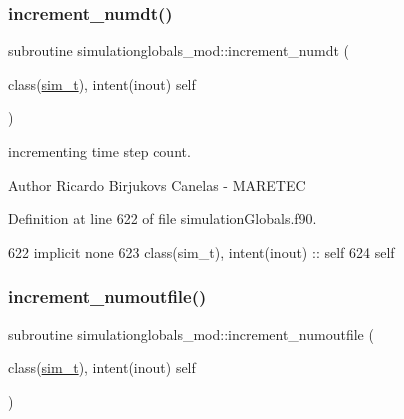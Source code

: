 \mbox{\label{namespacesimulationglobals__mod_ad983ee8885b275c6fa1369f1e158e078}} 
\subsubsection{\texorpdfstring{increment\+\_\+numdt()}{increment\_numdt()}}
{\footnotesize\ttfamily subroutine simulationglobals\+\_\+mod\+::increment\+\_\+numdt (\begin{DoxyParamCaption}\item[{class(\mbox{\hyperlink{structsimulationglobals__mod_1_1sim__t}{sim\+\_\+t}}), intent(inout)}]{self }\end{DoxyParamCaption})\hspace{0.3cm}{\ttfamily [private]}}



incrementing time step count. 

\begin{DoxyAuthor}{Author}
Ricardo Birjukovs Canelas -\/ M\+A\+R\+E\+T\+EC 
\end{DoxyAuthor}


Definition at line 622 of file simulation\+Globals.\+f90.


\begin{DoxyCode}
622     \textcolor{keywordtype}{implicit none}
623     \textcolor{keywordtype}{class}(sim\_t), \textcolor{keywordtype}{intent(inout)} :: self
624     self%
\end{DoxyCode}
\mbox{\label{namespacesimulationglobals__mod_a77d7175bc03e472ee9a00ee9f6ff1b0e}} 
\subsubsection{\texorpdfstring{increment\+\_\+numoutfile()}{increment\_numoutfile()}}
{\footnotesize\ttfamily subroutine simulationglobals\+\_\+mod\+::increment\+\_\+numoutfile (\begin{DoxyParamCaption}\item[{class(\mbox{\hyperlink{structsimulationglobals__mod_1_1sim__t}{sim\+\_\+t}}), intent(inout)}]{self }\end{DoxyParamCaption})\hspace{0.3cm}{\ttfamily [private]}}



